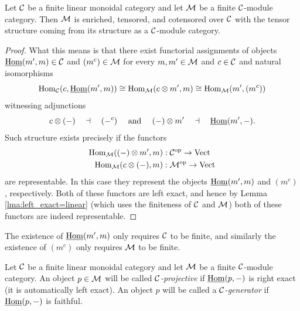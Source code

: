\documentclass{amsart}
\begin{document}


\begin{theorem} \label{thm:enrichment-of-mod-cats}
	Let $\mathcal C$ be a finite linear monoidal category and let $\mathcal M$ be a finite $\mathcal C$-module category. Then $\mathcal M$ is enriched, tensored, and cotensored over $\mathcal C$ with the tensor structure coming from its structure as a $\mathcal C$-module category.
\end{theorem} 

\begin{proof}
	What this means is that there exist functorial assignments of objects $\operatorname{\underline{Hom}}(m', m) \in \mathcal C$ and $(m^c) \in \mathcal M$ for every $m,m' \in \mathcal M$ and $c \in \mathcal C$ and natural isomorphisms
	\begin{equation*}
		\operatorname{Hom}_\mathcal C(c, \operatorname{\underline{Hom}}(m', m)) \cong \operatorname{Hom}_\mathcal M(c \otimes m', m) \cong \operatorname{Hom}_\mathcal M( m', (m^c))
	\end{equation*}
	witnessing adjunctions
	\begin{equation*}
			c \otimes (-) \quad \dashv\quad (-^c) \quad \textrm{ and } \quad (-) \otimes m' \quad \dashv \quad \operatorname{\underline{Hom}}(m', -).
	\end{equation*}
Such structure exists precisely if the functors
\begin{align*}
	\operatorname{Hom}_\mathcal M((-)\otimes m', m): \; & \mathcal C^{\mathrm{op}} \to \mathrm{Vect} \\
	\operatorname{Hom}_\mathcal M(c \otimes (-), m): \; & \mathcal M^{\mathrm{op}} \to \mathrm{Vect}
\end{align*}
are representable. In this case they represent the objects $\operatorname{\underline{Hom}}(m', m)$ and $(m^c)$, respectively. Both of these functors are left exact, and hence by Lemma \ref{lma:left_exact=linear} (which uses the finiteness of $\mathcal C$ and $\mathcal M$) both of these functors are indeed representable. 
\end{proof}

\begin{remark}
	The existence of $\operatorname{\underline{Hom}}(m', m)$ only requires $\mathcal C$ to be finite, and similarly the existence of $(m^c)$ only requires $\mathcal M$ to be finite.
\end{remark}


\begin{definition}
	Let $\mathcal C$ be a finite linear monoidal category and let $\mathcal M$ be a finite $\mathcal C$-module category. An object $p \in \mathcal M$ will be called {\em $\mathcal C$-projective} if $\operatorname{\underline{Hom}}(p, -)$ is right exact (it is automatically left exact). An object $p$ will be called a {\em $\mathcal C$-generator} if $\operatorname{\underline{Hom}}(p,-)$ is faithful. %
\end{definition}
\end{document}
